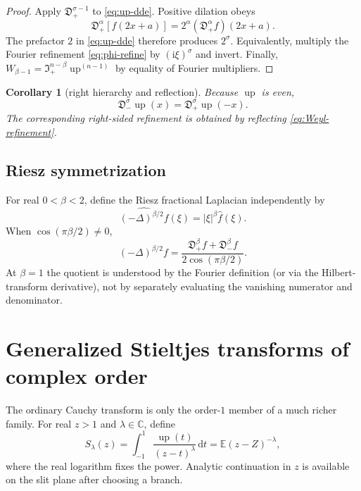 \documentclass[11pt,oneside]{article}
\numberwithin{equation}{section}
\theoremstyle{plain}
\newtheorem{corollary}[theorem]{Corollary}
\theoremstyle{definition}
\theoremstyle{remark}
\newcommand{\C}{\mathbb C}
\newcommand{\E}{\mathbb E}
\newcommand{\Up}{\operatorname{up}}
\newcommand{\dd}{\,\mathrm d}
\newcommand{\ii}{\mathrm i}
\begin{document}
\begin{proof}
Apply $\mathfrak D_+^{\sigma-1}$ to
\cref{eq:up-dde}.  Positive dilation obeys
\[
 \mathfrak D_+^\alpha[f(2x+a)]
 =2^\alpha(\mathfrak D_+^\alpha f)(2x+a).
\]
The prefactor $2$ in \cref{eq:up-dde} therefore produces $2^\sigma$.
Equivalently, multiply the Fourier refinement
\cref{eq:phi-refine} by $(\ii\xi)^\sigma$ and invert.  Finally,
$W_{\beta-1}=\mathfrak I_+^{n-\beta}\Up^{(n-1)}$ by equality of Fourier
multipliers.
\end{proof}

\begin{corollary}[right hierarchy and reflection]
Because $\Up$ is even,
\begin{equation}
 \mathfrak D_-^\sigma\Up(x)
 =\mathfrak D_+^\sigma\Up(-x).
 \label{eq:Weyl-reflection}
\end{equation}
The corresponding right-sided refinement is obtained by reflecting
\cref{eq:Weyl-refinement}.
\end{corollary}

\subsection{Riesz symmetrization}

For real $0<\beta<2$, define the Riesz fractional Laplacian independently by
\begin{equation}
 \widehat{(-\Delta)^{\beta/2}f}(\xi)
 =|\xi|^\beta\widehat f(\xi).
 \label{eq:Riesz-Fourier}
\end{equation}
When $\cos(\pi\beta/2)\ne0$,
\begin{equation}
 (-\Delta)^{\beta/2}f
 =\frac{\mathfrak D_+^\beta f+\mathfrak D_-^\beta f}
 {2\cos(\pi\beta/2)}.
 \label{eq:Riesz-Weyl}
\end{equation}
At $\beta=1$ the quotient is understood by the Fourier definition (or via the
Hilbert-transform derivative), not by separately evaluating the vanishing
numerator and denominator.

\section{Generalized Stieltjes transforms of complex order}
\label{sec:Stieltjes}

The ordinary Cauchy transform is only the order-$1$ member of a much richer
family.  For real $z>1$ and $\lambda\in\C$, define
\begin{equation}
 S_\lambda(z)
 =\int_{-1}^1\frac{\Up(t)}{(z-t)^\lambda}\dd t
 =\E(z-Z)^{-\lambda},
 \label{eq:S-lambda}
\end{equation}
where the real logarithm fixes the power.  Analytic continuation in $z$ is
available on the slit plane after choosing a branch.
\end{document}
